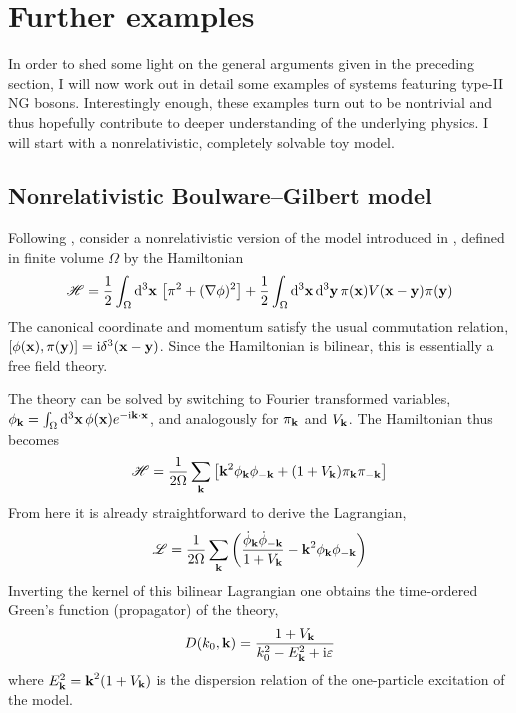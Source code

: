 \documentclass[final,3p,times,12pt,a4paper,sort&compress]{elsarticle}
\newcommand\Ham{\mathscr{H}}                %
\newcommand\Lag{\mathscr{L}}                %
\newcommand\vek[1]{{\boldsymbol{\bf #1}}}   %
\newcommand\skal[2]{\vek{#1}\cdot\vek{#2}}  %
\newcommand\imag{\mathrm i}                 %
\newcommand\ve{\varepsilon}
\newcommand\dthree{\mathop{{\rm d}^3\!}\nolimits} %
\begin{document}

\section{Further examples}
\label{sec:examples}
In order to shed some light on the general arguments given in the preceding
section, I will now work out in detail some examples of systems featuring
type-II NG bosons. Interestingly enough, these examples turn out to be
nontrivial and thus hopefully contribute to deeper understanding of the
underlying physics. I will start with a nonrelativistic, completely solvable
toy model.


\subsection{Nonrelativistic Boulware--Gilbert model}
\label{subsec:boulware}
Following \cite{Guralnik:1968gu}, consider a nonrelativistic version of the
model introduced in \cite{Boulware:1962zz}, defined in finite volume $\Omega$
by the Hamiltonian
\begin{equation}
\Ham=\frac12\int_\Omega\dthree\vek x\,\left[\pi^2+(\nabla\phi)^2\right]+
\frac1{2}\int_\Omega\dthree\vek x\dthree\vek y\,\pi(\vek x)V(\vek x-\vek
y)\pi(\vek y)
\end{equation}
The canonical coordinate and momentum satisfy the usual commutation relation,
$[\phi(\vek x),\pi(\vek y)]=\imag\delta^3(\vek x-\vek y)$. Since the
Hamiltonian is bilinear, this is essentially a free field theory.

The theory can be solved by switching to Fourier transformed variables,
$\phi_{\vek k}=\int_\Omega\dthree\vek x\,\phi(\vek x)e^{-\imag\skal kx}$, and
analogously for $\pi_{\vek k}$ and $V_{\vek k}$. The Hamiltonian thus becomes
\begin{equation}
\Ham=\frac1{2\Omega}\sum_{\vek k}\left[\vek k^2\phi_{\vek k}\phi_{-\vek k}+
(1+V_{\vek k})\pi_{\vek k}\pi_{-\vek k}\right]
\label{HamFT}
\end{equation}
From here it is already straightforward to derive the Lagrangian,
\begin{equation}
\Lag=\frac1{2\Omega}\sum_{\vek k}\left(\frac{\dot\phi_{\vek k}\dot\phi_{-\vek
k}}{1+V_{\vek k}}-\vek k^2\phi_{\vek k}\phi_{-\vek k}\right)
\label{Boulware_Lagrangian}
\end{equation}
Inverting the kernel of this bilinear Lagrangian one obtains the
time-ordered Green's function (propagator) of the theory,
\begin{equation}
D(k_0,\vek k)=\frac{1+V_{\vek k}}{k_0^2-E_{\vek k}^2+\imag\ve}
\end{equation}
where $E_{\vek k}^2=\vek k^2(1+V_{\vek k})$ is the dispersion relation of the
one-particle excitation of the model.
\end{document}
